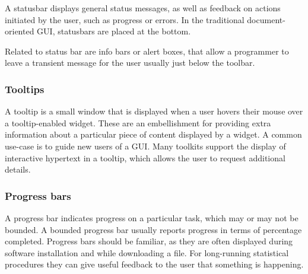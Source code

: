A statusbar displays general status messages, as well as feedback on
actions initiated by the user, such as progress or errors. In the
traditional document-oriented GUI, statusbars are placed at the bottom.

Related to status bar are info bars or alert boxes, that allow a
programmer to leave a transient message for the user usually just
below the toolbar.

\subsubsection{Tooltips}
\label{sec:GUI:basic-tooltips}

A tooltip is a small window that is displayed when a user hovers their
mouse over a tooltip-enabled widget. These are an embellishment for
providing extra information about a particular piece of content
displayed by a widget. A common use-case is to guide new users of a
GUI. Many toolkits support the display of interactive hypertext in a
tooltip, which allows the user to request additional details.

\subsubsection{Progress bars}

A progress bar indicates progress on a particular task, which may or
may not be bounded. A bounded progress bar usually reports progress in
terms of percentage completed. Progress bars should be familiar, as
they are often displayed during software installation and while
downloading a file. For long-running statistical procedures they can
give useful feedback to the user that something is happening.






